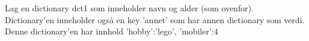 %
%
Lag en dictionary dct1 som inneholder navn og alder (som ovenfor). Dictionary'en inneholder også en key 'annet' som har annen dictionary som verdi. Denne dictionary'en har innhold {'hobby':'lego', 'mobiler':4}
